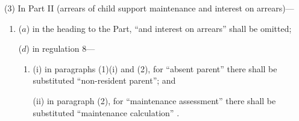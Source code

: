 \documentclass[12pt,a4paper]{article}
\begin{document}
(3) In Part II (arrears of child support maintenance and interest on arrears)—
\begin{enumerate}\item[]
($a$) in the heading to the Part, “and interest on arrears” shall be omitted;

%
%
%
%
%

($d$) in regulation 8—
\begin{enumerate}\item[]
(i) in paragraphs (1)(i)  and (2), for “absent parent” there shall be substituted “non-resident parent”; and

(ii) in paragraph (2), for “maintenance assessment” there shall be substituted “maintenance calculation”%
.
\end{enumerate}
%

\end{enumerate}
\end{document}
